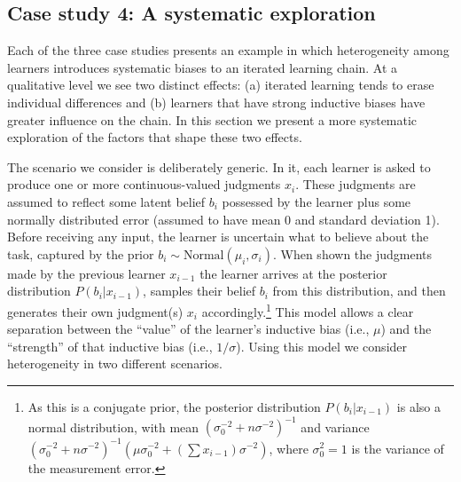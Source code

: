 \documentclass[doc]{apa6}
\begin{document}
\subsection{Case study 4: A systematic exploration}

Each of the three case studies presents an example in which heterogeneity among learners introduces systematic biases to an iterated learning chain. At a qualitative level we see two distinct effects: (a) iterated learning tends to erase individual differences and (b) learners that have strong inductive biases have greater influence on the chain. In this section we present a more systematic exploration of the factors that shape these two effects. 

The scenario we consider is  deliberately generic. In it, each learner is asked to produce one or more continuous-valued judgments $x_i$. These judgments are assumed to reflect some latent belief $b_i$ possessed by the learner plus some normally distributed error (assumed to have mean 0 and standard deviation 1). Before receiving any input, the learner is uncertain what to believe about the task, captured by the prior $b_i \sim \mbox{Normal}(\mu_i, \sigma_i)$. When shown the judgments made by the previous learner $x_{i-1}$ the learner arrives at the posterior distribution $P(b_i|x_{i-1})$, samples their belief $b_i$ from this distribution, and then generates their own judgment(s) $x_i$ accordingly.\footnote{As this is a conjugate prior, the posterior distribution $P(b_i | x_{i-1})$ is also a normal distribution, with mean $(\sigma_0^{-2} + n\sigma^{-2})^{-1}$ and variance $(\sigma_0^{-2} + n\sigma^{-2})^{-1}(\mu \sigma_0^{-2} + (\sum x_{i-1}) \sigma^{-2})$, where $\sigma_0^{2}=1$ is the variance of the measurement error.} This model allows a clear separation between the ``value'' of the learner's inductive bias (i.e.,  $\mu$) and the ``strength'' of that inductive bias (i.e., $1/\sigma$). Using this model we consider heterogeneity in two different scenarios. 

\smallskip
\end{document}
